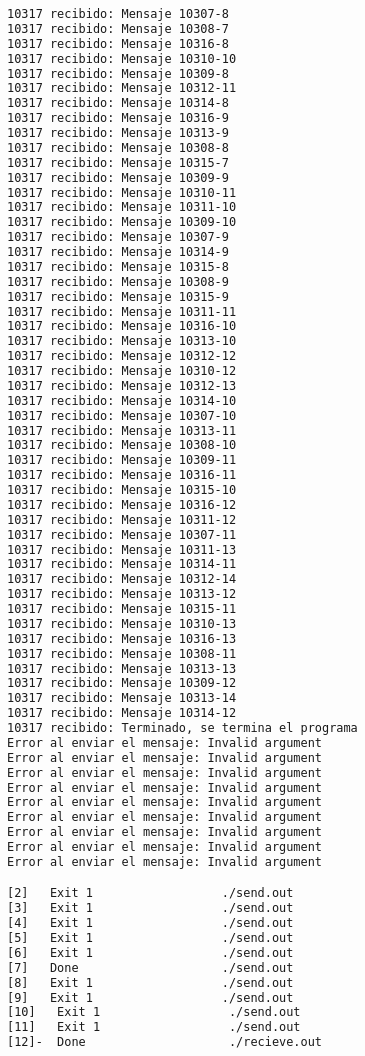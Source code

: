 \begin{lstlisting}[language=bash, style=CodeStyle, caption=diez productores y un consumidor, label=lst:10producidor1producidor]
10317 recibido: Mensaje 10307-8
10317 recibido: Mensaje 10308-7
10317 recibido: Mensaje 10316-8
10317 recibido: Mensaje 10310-10
10317 recibido: Mensaje 10309-8
10317 recibido: Mensaje 10312-11
10317 recibido: Mensaje 10314-8
10317 recibido: Mensaje 10316-9
10317 recibido: Mensaje 10313-9
10317 recibido: Mensaje 10308-8
10317 recibido: Mensaje 10315-7
10317 recibido: Mensaje 10309-9
10317 recibido: Mensaje 10310-11
10317 recibido: Mensaje 10311-10
10317 recibido: Mensaje 10309-10
10317 recibido: Mensaje 10307-9
10317 recibido: Mensaje 10314-9
10317 recibido: Mensaje 10315-8
10317 recibido: Mensaje 10308-9
10317 recibido: Mensaje 10315-9
10317 recibido: Mensaje 10311-11
10317 recibido: Mensaje 10316-10
10317 recibido: Mensaje 10313-10
10317 recibido: Mensaje 10312-12
10317 recibido: Mensaje 10310-12
10317 recibido: Mensaje 10312-13
10317 recibido: Mensaje 10314-10
10317 recibido: Mensaje 10307-10
10317 recibido: Mensaje 10313-11
10317 recibido: Mensaje 10308-10
10317 recibido: Mensaje 10309-11
10317 recibido: Mensaje 10316-11
10317 recibido: Mensaje 10315-10
10317 recibido: Mensaje 10316-12
10317 recibido: Mensaje 10311-12
10317 recibido: Mensaje 10307-11
10317 recibido: Mensaje 10311-13
10317 recibido: Mensaje 10314-11
10317 recibido: Mensaje 10312-14
10317 recibido: Mensaje 10313-12
10317 recibido: Mensaje 10315-11
10317 recibido: Mensaje 10310-13
10317 recibido: Mensaje 10316-13
10317 recibido: Mensaje 10308-11
10317 recibido: Mensaje 10313-13
10317 recibido: Mensaje 10309-12
10317 recibido: Mensaje 10313-14
10317 recibido: Mensaje 10314-12
10317 recibido: Terminado, se termina el programa
Error al enviar el mensaje: Invalid argument
Error al enviar el mensaje: Invalid argument
Error al enviar el mensaje: Invalid argument
Error al enviar el mensaje: Invalid argument
Error al enviar el mensaje: Invalid argument
Error al enviar el mensaje: Invalid argument
Error al enviar el mensaje: Invalid argument
Error al enviar el mensaje: Invalid argument
Error al enviar el mensaje: Invalid argument

[2]   Exit 1                  ./send.out
[3]   Exit 1                  ./send.out
[4]   Exit 1                  ./send.out
[5]   Exit 1                  ./send.out
[6]   Exit 1                  ./send.out
[7]   Done                    ./send.out
[8]   Exit 1                  ./send.out
[9]   Exit 1                  ./send.out
[10]   Exit 1                  ./send.out
[11]   Exit 1                  ./send.out
[12]-  Done                    ./recieve.out
\end{lstlisting}